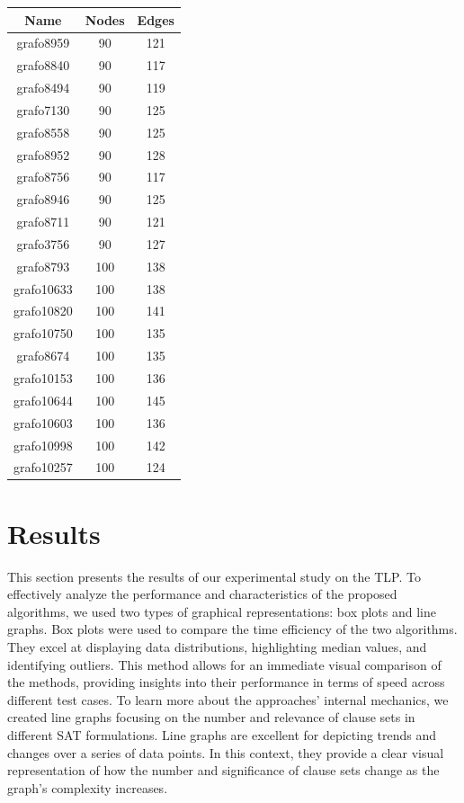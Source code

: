 \documentclass[bachelor, english]{algothesis}
\begin{document}
\hfill 
\begin{minipage}{.32\textwidth} %
\hspace*{1cm} 
\vspace*{10.35cm}
\begin{tabular}{|c|c|c|}
\hline
Name & Nodes & Edges \\
\hline
grafo8959 & 90 & 121 \\
grafo8840 & 90 & 117 \\
grafo8494 & 90 & 119 \\
grafo7130 & 90 & 125 \\
grafo8558 & 90 & 125 \\
grafo8952 & 90 & 128 \\
grafo8756 & 90 & 117 \\
grafo8946 & 90 & 125 \\
grafo8711 & 90 & 121 \\
grafo3756 & 90 & 127 \\
\hline
grafo8793 & 100 & 138 \\
grafo10633 & 100 & 138 \\
grafo10820 & 100 & 141 \\
grafo10750 & 100 & 135 \\
grafo8674 & 100 & 135 \\
grafo10153 & 100 & 136 \\
grafo10644 & 100 & 145 \\
grafo10603 & 100 & 136 \\
grafo10998 & 100 & 142 \\
grafo10257 & 100 & 124 \\
\hline
\end{tabular}
\end{minipage}

\newpage

\chapter{Results}
This section presents the results of our experimental study on the TLP. To effectively analyze the performance and characteristics of the proposed algorithms, we used two types of graphical representations: box plots and line graphs. Box plots were used to compare the time efficiency of the two algorithms. They excel at displaying data distributions, highlighting median values, and identifying outliers. This method allows for an immediate visual comparison of the methods, providing insights into their performance in terms of speed across different test cases. To learn more about the approaches' internal mechanics, we created line graphs focusing on the number and relevance of clause sets in different SAT formulations. Line graphs are excellent for depicting trends and changes over a series of data points. In this context, they provide a clear visual representation of how the number and significance of clause sets change as the graph's complexity increases. 
\end{document}
